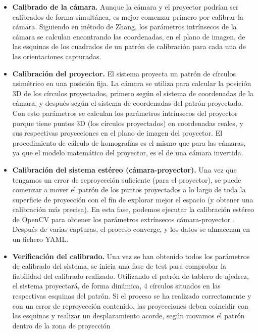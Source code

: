\begin{itemize}
\item\textbf{Calibrado de la cámara. } Aunque la cámara y el proyector podrían ser calibrados de forma simultánea, es mejor comenzar primero por calibrar la cámara. Siguiendo en método de Zhang, los parámetros intrínsecos de la cámara se calculan encontrando las coordenadas, en el plano de imagen, de las esquinas de los cuadrados de un patrón de calibración para cada una de las orientaciones capturadas.

\item\textbf{Calibración del proyector. } El sistema proyecta un patrón de círculos asimétrico en una posición fija. La cámara se utiliza para calcular la posición 3D de los círculos proyectados, primero según el sistema de coordenadas de la cámara, y después según el sistema de coordenadas del patrón proyectado. Con esto parámetros se calculan los parámetros intrínsecos del proyector porque tiene puntos 3D (los círculos proyectados) en coordenadas reales, y sus respectivas proyecciones en el plano de imagen del proyector. El procedimiento de cálculo de homografías es el mismo que para las cámaras, ya que el modelo matemático del proyector, es el de una cámara invertida. 

\item\textbf{Calibración del sistema estéreo (cámara-proyector). } Una vez que tengamos un error de reproyección suficiente (para el proyector), se puede comenzar a mover el patrón de los puntos proyectados a lo largo de toda la superficie de proyección con el fin de explorar mejor el espacio (y obtener una calibración más precisa). En esta fase, podemos ejecutar la calibración estéreo de OpenCV para obtener los parámetros extrínsecos cámara-proyector . Después de varias capturas, el proceso converge, y los datos se almacenan en un fichero YAML.

\item\textbf{Verificación del calibrado. } Una vez se han obtenido todos los parámetros de calibrado del sistema, se inicia una fase de test para comprobar la fiabilidad del calibrado realizado. Utilizando el patrón de tablero de ajedrez, el sistema proyectará, de forma dinámica, 4 círculos situados en las respectivas esquinas del patrón. Si el proceso se ha realizado correctamente y con un error de reproyección contenido, las proyecciones deben coincidir con las esquinas y realizar un desplazamiento acorde, según movamos el patrón dentro de la zona de proyección 
\end{itemize}

